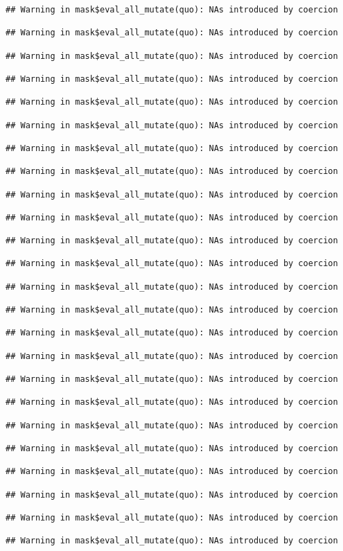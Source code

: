 \documentclass[
]{article}
\begin{document}
\begin{verbatim}
## Warning in mask$eval_all_mutate(quo): NAs introduced by coercion

## Warning in mask$eval_all_mutate(quo): NAs introduced by coercion

## Warning in mask$eval_all_mutate(quo): NAs introduced by coercion

## Warning in mask$eval_all_mutate(quo): NAs introduced by coercion

## Warning in mask$eval_all_mutate(quo): NAs introduced by coercion

## Warning in mask$eval_all_mutate(quo): NAs introduced by coercion

## Warning in mask$eval_all_mutate(quo): NAs introduced by coercion

## Warning in mask$eval_all_mutate(quo): NAs introduced by coercion

## Warning in mask$eval_all_mutate(quo): NAs introduced by coercion

## Warning in mask$eval_all_mutate(quo): NAs introduced by coercion

## Warning in mask$eval_all_mutate(quo): NAs introduced by coercion

## Warning in mask$eval_all_mutate(quo): NAs introduced by coercion

## Warning in mask$eval_all_mutate(quo): NAs introduced by coercion

## Warning in mask$eval_all_mutate(quo): NAs introduced by coercion

## Warning in mask$eval_all_mutate(quo): NAs introduced by coercion

## Warning in mask$eval_all_mutate(quo): NAs introduced by coercion

## Warning in mask$eval_all_mutate(quo): NAs introduced by coercion

## Warning in mask$eval_all_mutate(quo): NAs introduced by coercion

## Warning in mask$eval_all_mutate(quo): NAs introduced by coercion

## Warning in mask$eval_all_mutate(quo): NAs introduced by coercion

## Warning in mask$eval_all_mutate(quo): NAs introduced by coercion

## Warning in mask$eval_all_mutate(quo): NAs introduced by coercion

## Warning in mask$eval_all_mutate(quo): NAs introduced by coercion

## Warning in mask$eval_all_mutate(quo): NAs introduced by coercion


\end{verbatim}
\end{document}
